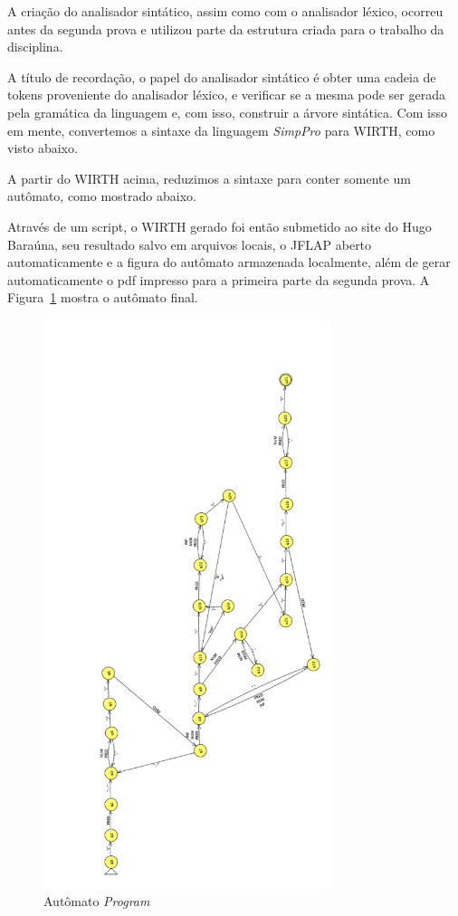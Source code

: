 
A criação do analisador sintático, assim como com o analisador léxico, ocorreu antes da segunda prova e utilizou parte da estrutura criada para o trabalho da disciplina.

A título de recordação, o papel do analisador sintático é obter uma cadeia de tokens proveniente do analisador léxico, e verificar se a mesma pode ser gerada pela gramática da linguagem e, com isso, construir a árvore sintática. Com isso em mente, convertemos a sintaxe da linguagem \emph{SimpPro} para WIRTH, como visto abaixo.



A partir do WIRTH acima, reduzimos a sintaxe para conter somente um autômato, como mostrado abaixo.



Através de um script, o WIRTH gerado foi então submetido ao site do Hugo Baraúna, seu resultado salvo em arquivos locais, o JFLAP aberto automaticamente e a figura do autômato armazenada localmente, além de gerar automaticamente o pdf impresso para a primeira parte da segunda prova. A Figura~\ref{fig:automato} mostra o autômato final.

\begin{figure}[htbp]
    \centering
    \includegraphics[width=0.75\textwidth]{./images/automato.png}
    \caption{Autômato \emph{Program}}
    \label{fig:automato}
\end{figure}
